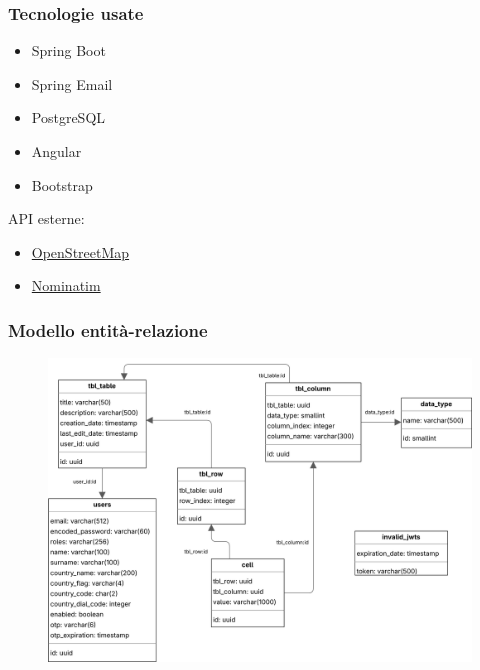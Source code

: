 \documentclass{beamer}
\begin{document}
\begin{frame}
  \frametitle{Tecnologie usate}

  \begin{itemize}
    \item[\faLeaf] Spring Boot
    \item[\faEnvelope] Spring Email
    \item[\faDatabase] PostgreSQL
  \end{itemize}

  \vspace{15pt}

  \begin{itemize}
    \item[\faHtml5] Angular
    \item[\faCss3] Bootstrap
  \end{itemize}

  \vspace{18pt}

  API esterne:
  \begin{itemize}
    \item[\faMapMarker] \href{https://www.openstreetmap.org/}{OpenStreetMap}
    \item[\faMapSigns] \href{https://nominatim.openstreetmap.org/}{Nominatim}
  \end{itemize}
\end{frame}

\begin{frame}
  \frametitle{Modello entità-relazione}
  \begin{figure}
    \includegraphics[width=\textwidth]{entity_relation}
  \end{figure}
\end{frame}
\end{document}
